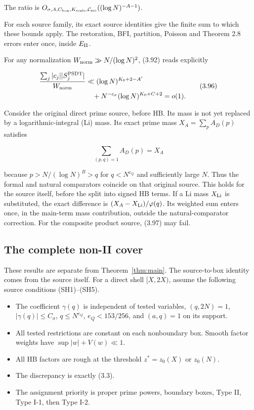The ratio is
$O_{\sigma,A,C_{\rm box},K_{\rm scale},\mathcal C_{\rm src}}
((\log N)^{-A-1})$.

For each source family, its exact source identities give the
finite sum to which these bounds apply.
The restoration, BFI, partition, Poisson and Theorem 2.8 errors
enter once, inside $E_{\rm II}$.

For any normalization $W_{\rm norm}\gg N/(\log N)^2$, (3.92)
reads explicitly

\[
\begin{aligned}
\frac{\sum_j|c_j||S_j^{\rm PSDT}|}{W_{\rm norm}}
 &\ll(\log N)^{K_0+2-A'}\\
 &\quad+N^{-c_\sigma}(\log N)^{K_0+C+2}=o(1).
\end{aligned}
\tag{3.96}
\]

Consider the original direct prime source, before HB. Its mass is not yet replaced by a logarithmic-integral (Li) mass.
Its exact prime mass $X_A=\sum_pA_D(p)$ satisfies

\[
\sum_{(p,q)=1}A_D(p)=X_A
\tag{3.97}
\]

because $p>N/(\log N)^B>q$ for $q<N^{e_Q}$ and sufficiently large $N$.
Thus the formal and natural comparators coincide on that original source.
This holds for the source itself, before the split into signed HB terms.
If a Li mass $X_{\rm Li}$ is substituted, the exact difference is
$(X_A-X_{\rm Li})/\varphi(q)$.
Its weighted sum enters once, in the main-term mass contribution,
outside the natural-comparator correction.
For the composite product source, (3.97) may fail.

\subsection{The complete non-II cover}\label{sec:pi-nonII}

These results are separate from Theorem~\ref{thm:main}.
The source-to-box identity comes from the source itself.
For a direct shell $[X,2X)$, assume the following source conditions (SH1)--(SH5).
\begin{itemize}[leftmargin=3.2em]
\item[(SH1)] The coefficient $\gamma(q)$ is independent of tested variables, $(q,2N)=1$,
$|\gamma(q)|\le C_\sigma$, $q\le N^{e_Q}$, $e_Q<153/256$,
and $(a,q)=1$ on its support.
\item[(SH2)] All tested restrictions are constant on each nonboundary box.
Smooth factor weights have $\sup|w|+V(w)\ll1$.
\item[(SH3)] All HB factors are rough at the threshold $z^*=z_0(X)$ or $z_0(N)$.
\item[(SH4)] The discrepancy is exactly (3.3).
\item[(SH5)] The assignment priority is proper prime powers,
boundary boxes, Type II, Type I-1, then Type I-2.
\end{itemize}

